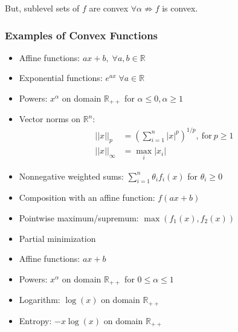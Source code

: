 But, sublevel sets of $f$ are convex $\forall \alpha \nRightarrow f$ is convex.

\subsubsection{Examples of Convex Functions}
\begin{itemize}
    \item Affine functions: $ ax + b,\; \forall a,b\in \mathbb{R}$
    \item Exponential functions: $e^{ax}\; \forall a\in \mathbb{R}$
    \item Powers: $x^\alpha$ on domain $\mathbb{R}_{++}$ for $\alpha \leq 0, \alpha \geq1$
    \item Vector norms on $\mathbb{R}^n$:
          \begin{align*}
              ||x||_p      & ={(\sum_{i=1}^n|x|^p)}^{1/p},\mathrm{~for~}p\geq1 \\
              ||x||_\infty & =\max_i|x_i|
          \end{align*}
\end{itemize}
\newpar{}
\begin{itemize}
    \item Nonnegative weighted sums: $\sum_{i=1}^{n} \theta_i f_i(x)$ for $\theta_i \geq 0$
    \item Composition with an affine function: $f(ax+b)$
    \item Pointwise maximum/supremum: $\max(f_1(x),f_2(x))$
    \item Partial minimization
\end{itemize}

\newpar{}

\begin{itemize}
    \item Affine functions: $ ax + b$
    \item Powers: $x^\alpha$ on domain $\mathbb{R}_{++}$ for $0\leq\alpha \leq 1$
    \item Logarithm: $\log(x)$ on domain $\mathbb{R}_{++}$
    \item Entropy: $-x\log(x)$ on domain $\mathbb{R}_{++}$
\end{itemize}

